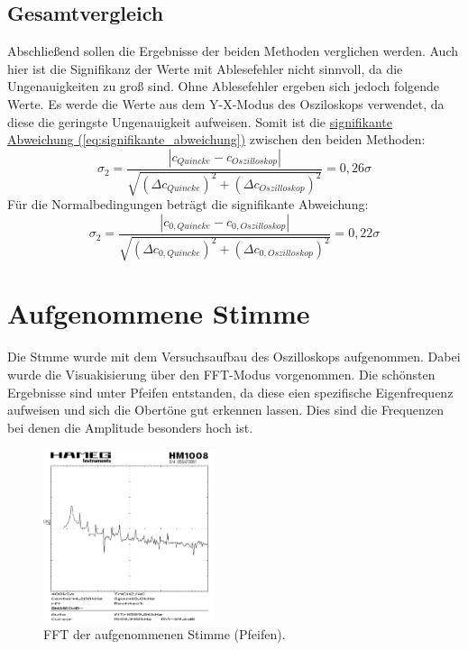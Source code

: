 \subsection{Gesamtvergleich}
Abschließend sollen die Ergebnisse der beiden Methoden verglichen werden. Auch hier ist die Signifikanz der Werte mit Ablesefehler nicht sinnvoll, da die Ungenauigkeiten zu groß sind. Ohne Ablesefehler ergeben sich jedoch folgende Werte. Es werde die Werte aus dem Y-X-Modus des Osziloskops verwendet, da diese die geringste Ungenauigkeit aufweisen. Somit ist die \hyperref[eq:signifikante_abweichung]{signifikante Abweichung (\ref*{eq:signifikante_abweichung})} zwischen den beiden Methoden:
\begin{equation}
    \sigma_2 = \frac{\left| c_{Quincke} - c_{Oszilloskop} \right|}{\sqrt{(\Delta c_{Quincke})^2 + (\Delta c_{Oszilloskop})^2}} = 0,26\sigma
\end{equation}
Für die Normalbedingungen beträgt die signifikante Abweichung:
\begin{equation}
    \sigma_2 = \frac{\left| c_{0,Quincke} - c_{0,Oszilloskop} \right|}{\sqrt{(\Delta c_{0,Quincke})^2 + (\Delta c_{0,Oszilloskop})^2}} = 0,22\sigma
\end{equation}

\section{Aufgenommene Stimme}
Die Stmme wurde mit dem Versuchsaufbau des Oszilloskops aufgenommen. Dabei wurde die Visuakisierung über den FFT-Modus vorgenommen. Die schönsten Ergebnisse sind unter Pfeifen entstanden, da diese eien spezifische Eigenfrequenz aufweisen und sich die Obertöne gut erkennen lassen. Dies sind die Frequenzen bei denen die Amplitude besonders hoch ist. 
\begin{figure}[!ht]
    \centering
    \includegraphics[width=0.45\textwidth]{img/26/Stimme.pdf}
    \caption{FFT der aufgenommenen Stimme (Pfeifen).}
    \label{fig:stimme_fft}
\end{figure}

